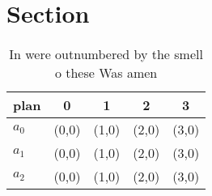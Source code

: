 \documentclass[a4paper]{article}
\begin{document}
\section{Section}

\begin{table}
\begin{adjustbox}{width=0.5\columnwidth}
\begin{tabular}{|l|l|l|l|l|}
\hline
\textbf{plan} & \multicolumn{1}{c|}{\textbf{0}} & \multicolumn{1}{c|}{\textbf{1}} & \multicolumn{1}{c|}{\textbf{2}} & \multicolumn{1}{c|}{\textbf{3}} \\ \hline
\textbf{$a_0$}  & (0,0) & (1,0) & (2,0) & (3,0) \\ \hline
\textbf{$a_1$}  & (0,0) & (1,0) & (2,0) & (3,0) \\ \hline
\textbf{$a_2$}  & (0,0) & (1,0) & (2,0) & (3,0) \\ \hline
\end{tabular}
\end{adjustbox}
\caption{In were outnumbered by the smell o these Was amen
}
\end{table}
\end{document}
